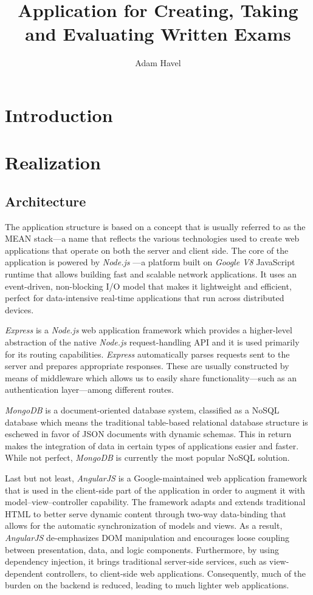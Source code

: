 \documentclass[thesis=M,english,hidelinks]{FITthesis}[2012/10/20]
\title{Application for Creating, Taking and Evaluating Written Exams}
\author{Adam Havel}
\begin{document}
\chapter{Introduction}


\chapter{Realization}

  \section{Architecture}

The application structure is based on a concept that is usually referred to as the MEAN stack---a name that reflects the various technologies used to create web applications that operate on both the server and client side. The core of the application is powered by \textit{Node.js} \cite{node}---a platform built on \textit{Google V8} JavaScript runtime that allows building fast and scalable network applications. It uses an event-driven, non-blocking I/O model that makes it lightweight and efficient, perfect for data-intensive real-time applications that run across distributed devices.

\textit{Express} \cite{express} is a \textit{Node.js} web application framework which provides a higher-level abstraction of the native \textit{Node.js} request-handling API and it is used primarily for its routing capabilities. \textit{Express} automatically parses requests sent to the server and prepares appropriate responses. These are usually constructed by means of middleware which allows us to easily share functionality---such as an authentication layer---among different routes.

\textit{MongoDB} \cite{mongodb} is a document-oriented database system, classified as a NoSQL database which means the traditional table-based relational database structure is eschewed in favor of JSON documents with dynamic schemas. This in return makes the integration of data in certain types of applications easier and faster. While not perfect, \textit{MongoDB} is currently the most popular NoSQL solution.

Last but not least, \textit{AngularJS} \cite{angularjs} is a Google-maintained web application framework that is used in the client-side part of the application in order to augment it with model–view–controller capability. The framework adapts and extends traditional HTML to better serve dynamic content through two-way data-binding that allows for the automatic synchronization of models and views. As a result, \textit{AngularJS} de-emphasizes DOM manipulation and encourages loose coupling between presentation, data, and logic components. Furthermore, by using dependency injection, it brings traditional server-side services, such as view-dependent controllers, to client-side web applications. Consequently, much of the burden on the backend is reduced, leading to much lighter web applications.
\end{document}
